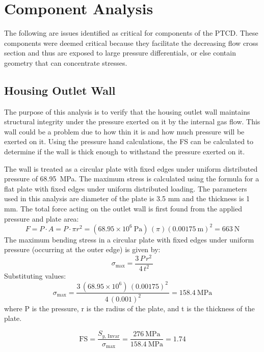 \documentclass[12pt, letterpaper]{report}%
\newcounter{mycounter}           %
\newcounter{sub}[mycounter]      %
\newcommand{\specPressure}{\SI{68.95}{\mega \pascal}}%
\begin{document}
\section{Component Analysis}
The following are issues identified as critical for components of the PTCD. These components were deemed critical
because they facilitate the decreasing flow cross section and thus are exposed to large pressure differentials, 
or else contain geometry that can concentrate stresses. 
\subsection{Housing Outlet Wall}
	The purpose of this analysis is to verify that the housing outlet wall maintains structural integrity under the pressure exerted on it 
	by the internal gas flow. This wall could be a problem due to how thin it is and how much pressure will be exerted on it. Using the pressure
	hand calculations, the FS can be calculated to determine if the wall is thick enough to withstand the pressure exerted on it.

	The wall is treated as a circular plate with fixed edges under uniform distributed pressure of \specPressure. The maximum stress is calculated using the formula for
	a flat plate with fixed edges under uniform distributed loading. The parameters used in this analysis are diameter of the plate is 3.5 mm and the thickness is 1 mm.
	The total force acting on the outlet wall is first found from the applied pressure and plate area:
	 \begin{equation}
        F = P \cdot A = P \cdot \pi r^2
        = (68.95 \times 10^6~\text{Pa})\,(\pi)(0.00175~\text{m})^2
        = 663~\text{N}
    \end{equation}
	The maximum bending stress in a circular plate with fixed edges under uniform pressure (occurring at the outer edge) is given by:
	    \begin{equation}
        \sigma_{\max} = \frac{3\,P\,r^2\,}{4\,t^2}
    \end{equation}
    Substituting values:
    \begin{equation}
        \sigma_{\max}
        = \frac{3\,(68.95 \times 10^6)\,(0.00175)^2\,}
               {4\,(0.001)^2}
        = 158.4~\text{MPa}
    \end{equation}
	where P is the pressure, r is the radius of the plate, and t is the thickness of the plate.

	    \begin{equation}
        \text{FS} = \frac{S_{y,\,\text{Invar}}}{\sigma_{\max}}
                   = \frac{276~\text{MPa}}{158.4~\text{MPa}}
                   = 1.74
    \end{equation}
\end{document}

